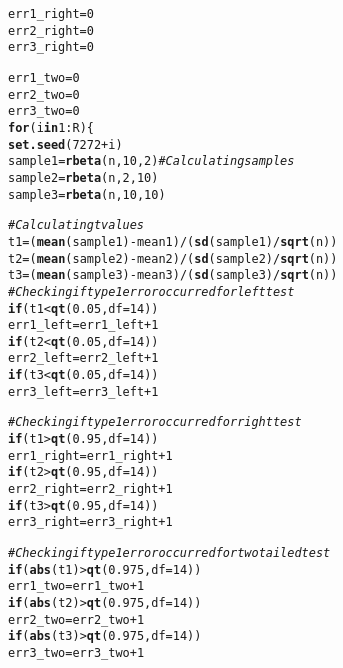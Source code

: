 \documentclass{article}\usepackage[]{graphicx}\usepackage[]{xcolor}
\makeatletter
\newcommand{\hlnum}[1]{\textcolor[rgb]{0.686,0.059,0.569}{#1}}%
\newcommand{\hlcom}[1]{\textcolor[rgb]{0.678,0.584,0.686}{\textit{#1}}}%
\newcommand{\hlopt}[1]{\textcolor[rgb]{0,0,0}{#1}}%
\newcommand{\hldef}[1]{\textcolor[rgb]{0.345,0.345,0.345}{#1}}%
\newcommand{\hlkwa}[1]{\textcolor[rgb]{0.161,0.373,0.58}{\textbf{#1}}}%
\newcommand{\hlkwb}[1]{\textcolor[rgb]{0.69,0.353,0.396}{#1}}%
\newcommand{\hlkwc}[1]{\textcolor[rgb]{0.333,0.667,0.333}{#1}}%
\newcommand{\hlkwd}[1]{\textcolor[rgb]{0.737,0.353,0.396}{\textbf{#1}}}%
\newenvironment{kframe}{%
 \def\at@end@of@kframe{}%
 \ifinner\ifhmode%
  \def\at@end@of@kframe{\end{minipage}}%
  \begin{minipage}{\columnwidth}%
 \fi\fi%
 \def\FrameCommand##1{\hskip\@totalleftmargin \hskip-\fboxsep
 \colorbox{shadecolor}{##1}\hskip-\fboxsep
     \hskip-\linewidth \hskip-\@totalleftmargin \hskip\columnwidth}%
 \MakeFramed {\advance\hsize-\width
   \@totalleftmargin\z@ \linewidth\hsize
   \@setminipage}}%
 {\par\unskip\endMakeFramed%
 \at@end@of@kframe}
\newenvironment{knitrout}{}{} %
\makeatother
\begin{document}
\begin{enumerate}
\begin{knitrout}
\begin{kframe}
\begin{alltt}
\hldef{err1_right}\hlkwb{=}\hlnum{0}
\hldef{err2_right}\hlkwb{=}\hlnum{0}
\hldef{err3_right}\hlkwb{=}\hlnum{0}

\hldef{err1_two}\hlkwb{=}\hlnum{0}
\hldef{err2_two}\hlkwb{=}\hlnum{0}
\hldef{err3_two}\hlkwb{=}\hlnum{0}
\hlkwa{for}\hldef{(i} \hlkwa{in} \hlnum{1}\hlopt{:}\hldef{R)\{}
  \hlkwd{set.seed}\hldef{(}\hlnum{7272}\hlopt{+}\hldef{i)}
  \hldef{sample1} \hlkwb{=} \hlkwd{rbeta}\hldef{(n,} \hlnum{10}\hldef{,} \hlnum{2}\hldef{)} \hlcom{#Calculating samples}
  \hldef{sample2} \hlkwb{=} \hlkwd{rbeta}\hldef{(n,} \hlnum{2}\hldef{,} \hlnum{10}\hldef{)}
  \hldef{sample3} \hlkwb{=} \hlkwd{rbeta}\hldef{(n,} \hlnum{10}\hldef{,} \hlnum{10}\hldef{)}

  \hlcom{#Calculating t values}
  \hldef{t1} \hlkwb{=} \hldef{(}\hlkwd{mean}\hldef{(sample1)}\hlopt{-}\hldef{mean1)}\hlopt{/}\hldef{(}\hlkwd{sd}\hldef{(sample1)}\hlopt{/}\hlkwd{sqrt}\hldef{(n))}
  \hldef{t2} \hlkwb{=} \hldef{(}\hlkwd{mean}\hldef{(sample2)}\hlopt{-}\hldef{mean2)}\hlopt{/}\hldef{(}\hlkwd{sd}\hldef{(sample2)}\hlopt{/}\hlkwd{sqrt}\hldef{(n))}
  \hldef{t3} \hlkwb{=} \hldef{(}\hlkwd{mean}\hldef{(sample3)}\hlopt{-}\hldef{mean3)}\hlopt{/}\hldef{(}\hlkwd{sd}\hldef{(sample3)}\hlopt{/}\hlkwd{sqrt}\hldef{(n))}
  \hlcom{#Checking if type 1 error occurred for left test}
  \hlkwa{if} \hldef{(t1}\hlopt{<}\hlkwd{qt}\hldef{(}\hlnum{0.05}\hldef{,} \hlkwc{df}\hldef{=}\hlnum{14}\hldef{))}
    \hldef{err1_left}\hlkwb{=}\hldef{err1_left}\hlopt{+}\hlnum{1}
  \hlkwa{if} \hldef{(t2}\hlopt{<}\hlkwd{qt}\hldef{(}\hlnum{0.05}\hldef{,} \hlkwc{df}\hldef{=}\hlnum{14}\hldef{))}
    \hldef{err2_left}\hlkwb{=}\hldef{err2_left}\hlopt{+}\hlnum{1}
  \hlkwa{if} \hldef{(t3}\hlopt{<}\hlkwd{qt}\hldef{(}\hlnum{0.05}\hldef{,} \hlkwc{df}\hldef{=}\hlnum{14}\hldef{))}
    \hldef{err3_left}\hlkwb{=}\hldef{err3_left}\hlopt{+}\hlnum{1}


  \hlcom{#Checking if type 1 error occurred for right test}
  \hlkwa{if} \hldef{(t1}\hlopt{>}\hlkwd{qt}\hldef{(}\hlnum{0.95}\hldef{,} \hlkwc{df}\hldef{=}\hlnum{14}\hldef{))}
    \hldef{err1_right}\hlkwb{=}\hldef{err1_right}\hlopt{+}\hlnum{1}
  \hlkwa{if} \hldef{(t2}\hlopt{>}\hlkwd{qt}\hldef{(}\hlnum{0.95}\hldef{,} \hlkwc{df}\hldef{=}\hlnum{14}\hldef{))}
    \hldef{err2_right}\hlkwb{=}\hldef{err2_right}\hlopt{+}\hlnum{1}
  \hlkwa{if} \hldef{(t3}\hlopt{>}\hlkwd{qt}\hldef{(}\hlnum{0.95}\hldef{,} \hlkwc{df}\hldef{=}\hlnum{14}\hldef{))}
    \hldef{err3_right}\hlkwb{=}\hldef{err3_right}\hlopt{+}\hlnum{1}


  \hlcom{#Checking if type 1 error occurred for two tailed test}
  \hlkwa{if} \hldef{(}\hlkwd{abs}\hldef{(t1)}\hlopt{>}\hlkwd{qt}\hldef{(}\hlnum{0.975}\hldef{,} \hlkwc{df}\hldef{=}\hlnum{14}\hldef{))}
    \hldef{err1_two}\hlkwb{=}\hldef{err1_two}\hlopt{+}\hlnum{1}
  \hlkwa{if} \hldef{(}\hlkwd{abs}\hldef{(t2)}\hlopt{>}\hlkwd{qt}\hldef{(}\hlnum{0.975}\hldef{,} \hlkwc{df}\hldef{=}\hlnum{14}\hldef{))}
    \hldef{err2_two}\hlkwb{=}\hldef{err2_two}\hlopt{+}\hlnum{1}
  \hlkwa{if} \hldef{(}\hlkwd{abs}\hldef{(t3)}\hlopt{>}\hlkwd{qt}\hldef{(}\hlnum{0.975}\hldef{,} \hlkwc{df}\hldef{=}\hlnum{14}\hldef{))}
    \hldef{err3_two}\hlkwb{=}\hldef{err3_two}\hlopt{+}\hlnum{1}


\end{alltt}
\end{kframe}
\end{knitrout}
\end{enumerate}
\end{document}
